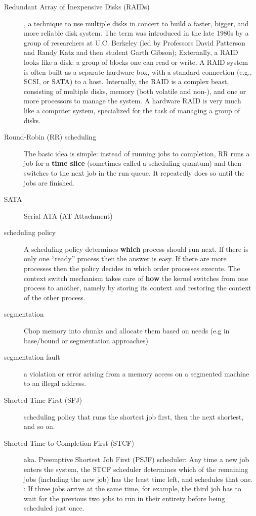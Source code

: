 \begin{description}
\item[Redundant Array of Inexpensive Disks (RAIDs)] , a technique to use multiple disks in concert to build a faster, bigger, and more reliable disk system. The term was introduced in the late 1980s by a group of researchers at U.C. Berkeley (led by Professors David Patterson and Randy Katz and then student Garth Gibson); Externally, a RAID looks like a disk: a group of blocks one can read or write. A RAID system is often built as a separate hardware box, with a standard connection (e.g., SCSI, or SATA) to a host. Internally, the RAID is a complex beast, consisting of multiple disks, memory (both volatile and non-), and one or more processors to manage the system. A hardware RAID is very much like a computer system, specialized for the task of managing a group of disks.

\item[Round-Robin (RR) scheduling] The basic idea is simple: instead of running jobs to completion, RR runs a job for a \textbf{time slice} (sometimes called a scheduling quantum) and then switches to the next job in the run queue. It repeatedly does so until the jobs are finished. 

\item[SATA] Serial ATA (AT Attachment)

\item[scheduling policy] A scheduling policy determines \textbf{which} process should run next. If there is only one “ready” process then the answer is easy. If there are more processes then the policy decides in which order processes
execute. The context switch mechanism takes care of \textbf{how} the kernel switches from one process to another, namely by storing its context and restoring the context of the other process.

\item[segmentation] Chop memory into  chunks and allocate them based on needs (e.g in base/bound or segmentation approaches)

\item[segmentation fault] a violation or error arising from a memory access on a segmented machine to an illegal address.

\item[Shorted Time First (SFJ)]  scheduling policy that runs the shortest job first, then the next shortest, and so on.

\item[Shorted Time-to-Completion First (STCF)] aka. Preemptive Shortest Job First (PSJF) scheduler: Any time a new job enters the system, the STCF scheduler determines which of the remaining jobs (including the new job) has the least time left, and schedules that one. : If three jobs arrive at the same time, for example, the third job has to wait for the previous two jobs to run in their entirety before being scheduled just once.


\end{description}
